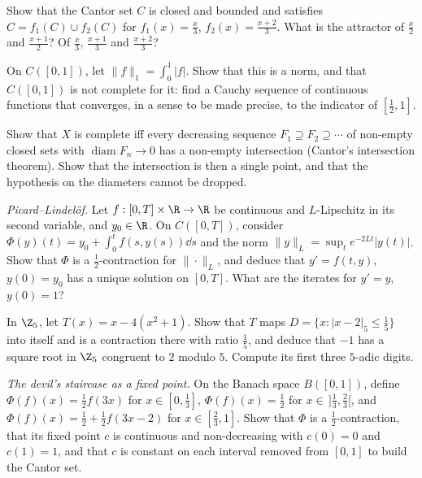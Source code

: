 \begin{exercise}[$\star$]\label{ex:cantorifs}
Show that the Cantor set $C$ is closed and bounded and satisfies $C=f_1(C)\cup f_2(C)$ for $f_1(x)=\frac x3$, $f_2(x)=\frac{x+2}3$. What is the attractor of
$\frac x2$ and $\frac{x+1}2$? Of $\frac x3$, $\frac{x+1}3$ and $\frac{x+2}3$?
\end{exercise}

\begin{exercise}[$\star\star$]\label{ex:L1incomplete}
On $C([0,1])$, let $\|f\|_1=\int_0^1|f|$. Show that this is a norm, and that $C([0,1])$ is not complete for it: find a Cauchy sequence of
continuous functions that converges, in a sense to be made precise, to the indicator of $[\frac12,1]$.
\end{exercise}

\begin{exercise}[$\star\star$]\label{ex:cantorinter}
Show that $X$ is complete iff every decreasing sequence $F_1\supseteq F_2\supseteq\cdots$ of non-empty closed sets with $\operatorname{diam}F_n\to0$ has a non-empty
intersection (Cantor's intersection theorem). Show that the intersection is then a single point, and that the hypothesis on the
diameters cannot be dropped.
\end{exercise}

\begin{exercise}[$\star\star$]\label{ex:picard}
\emph{Picard--Lindel\"of.} Let $f:[0,T]\times\R\to\R$ be continuous and $L$-Lipschitz in its second variable, and $y_0\in\R$. On $C([0,T])$, consider
$\Phi(y)(t)=y_0+\int_0^tf(s,y(s))\dd s$ and the norm $\|y\|_L=\sup_te^{-2Lt}|y(t)|$. Show that $\Phi$ is a $\frac12$-contraction for $\|\cdot\|_L$, and deduce that
$y'=f(t,y)$, $y(0)=y_0$ has a unique solution on $[0,T]$. What are the iterates for $y'=y$, $y(0)=1$?
\end{exercise}

\begin{exercise}[$\star\star$]\label{ex:hensel}
In $\Z_5$, let $T(x)=x-4(x^2+1)$. Show that $T$ maps $D=\{x:|x-2|_5\le\frac15\}$ into itself and is a contraction there with ratio $\frac15$, and deduce that
$-1$ has a square root in $\Z_5$ congruent to $2$ modulo $5$. Compute its first three $5$-adic digits.
\end{exercise}

\begin{exercise}[$\star\star\star$]\label{ex:devil}
\emph{The devil's staircase as a fixed point.} On the Banach space $B([0,1])$, define $\Phi(f)(x)=\frac12f(3x)$ for $x\in[0,\frac13]$, $\Phi(f)(x)=\frac12$ for
$x\in\,]\frac13,\frac23[$, and $\Phi(f)(x)=\frac12+\frac12f(3x-2)$ for $x\in[\frac23,1]$. Show that $\Phi$ is a $\frac12$-contraction, that its fixed point $c$ is continuous
and non-decreasing with $c(0)=0$ and $c(1)=1$, and that $c$ is constant on each interval removed from $[0,1]$ to build the Cantor set.
\end{exercise}

